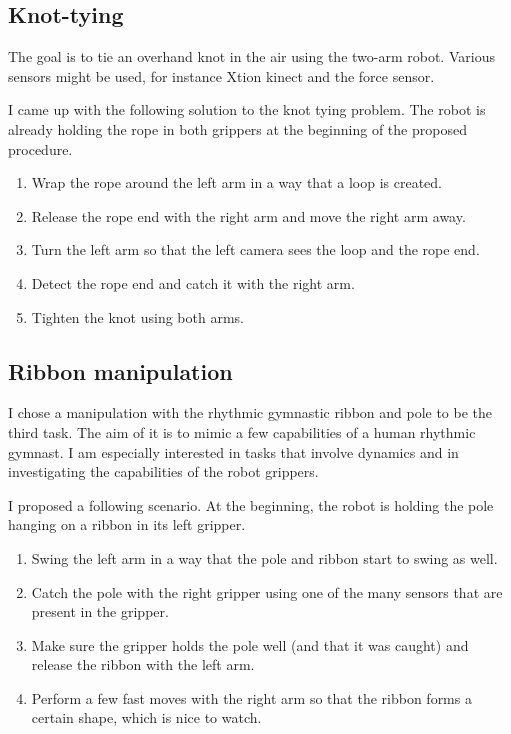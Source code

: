        \subsection{Knot-tying}
            The goal is to tie an overhand knot in the air using the two-arm robot. Various sensors might be used, for instance Xtion kinect and the force sensor.

            I came up with the following solution to the knot tying problem. The robot is already holding the rope in both grippers at the beginning of the proposed procedure.
%
            \begin{enumerate}
                \item Wrap the rope around the left arm in a way that a loop is created.
                \item Release the rope end with the right arm and move the right arm away.
                \item Turn the left arm so that the left camera sees the loop and the rope end.
                \item Detect the rope end and catch it with the right arm.
                \item Tighten the knot using both arms.
            \end{enumerate}

        \subsection{Ribbon manipulation}
            I chose a manipulation with the rhythmic gymnastic ribbon and pole to be the third task. The aim of it is to mimic a few capabilities of a human rhythmic gymnast. I am especially interested in tasks that involve dynamics and in investigating the capabilities of the robot grippers.

            I proposed a following scenario. At the beginning, the robot is holding the pole hanging on a ribbon in its left gripper.
%
            \begin{enumerate}
                \item Swing the left arm in a way that the pole and ribbon start to swing as well.
                \item Catch the pole with the right gripper using one of the many sensors that are present in the gripper.
                \item Make sure the gripper holds the pole well (and that it was caught) and release the ribbon with the left arm.
                \item Perform a few fast moves with the right arm so that the ribbon forms a certain shape, which is nice to watch.
           \end{enumerate}

